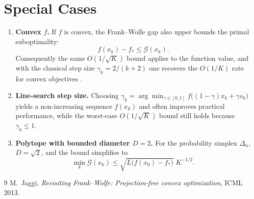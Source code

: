 \documentclass{article}
\newcommand{\gap}{\mathcal{G}}
\begin{document}
\section*{Special Cases}
\begin{enumerate}
\item \textbf{Convex $f$.} If $f$ is convex, the Frank–Wolfe gap also upper bounds the primal suboptimality:
\[
f(x_k)-f_* \le \gap(x_k) .
\]
Consequently the same $O(1/\sqrt{K})$ bound applies to the function value, and with the classical step size $\gamma_k=2/(k+2)$ one recovers the $O(1/K)$ rate for convex objectives \cite{Jaggi2013}.

\item \textbf{Line‑search step size.} Choosing $\gamma_k=\arg\min_{\gamma\in[0,1]}f\bigl((1-\gamma)x_k+\gamma s_k\bigr)$ yields a non‑increasing sequence $f(x_k)$ and often improves practical performance, while the worst‑case $O(1/\sqrt{K})$ bound still holds because $\gamma_k\le1$.

\item \textbf{Polytope with bounded diameter $D=2$.} For the probability simplex $\Delta_n$, $D=\sqrt{2}$, and the bound simplifies to
\[
\min_{k}\gap(x_k)\le
\sqrt{L\bigl(f(x_0)-f_*\bigr)}\;K^{-1/2}.
\]
\end{enumerate}

\begin{thebibliography}{9}
M.~Jaggi, \emph{Revisiting Frank–Wolfe: Projection‑free convex optimization}, ICML 2013.
\end{thebibliography}
\end{document}
